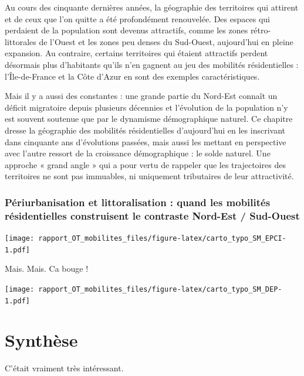 \documentclass[]{book}
\begin{document}
Au cours des cinquante dernières années, la géographie des territoires
qui attirent et de ceux que l'on quitte a été profondément renouvelée.
Des espaces qui perdaient de la population sont devenus attractifs,
comme les zones rétro-littorales de l'Ouest et les zones peu denses du
Sud-Ouest, aujourd'hui en pleine expansion. Au contraire, certains
territoires qui étaient attractifs perdent désormais plus d'habitants
qu'ils n'en gagnent au jeu des mobilités résidentielles :
l'Île-de-France et la Côte d'Azur en sont des exemples caractéristiques.

Mais il y a aussi des constantes : une grande partie du Nord-Est connaît
un déficit migratoire depuis plusieurs décennies et l'évolution de la
population n'y est souvent soutenue que par le dynamisme démographique
naturel. Ce chapitre dresse la géographie des mobilités résidentielles
d'aujourd'hui en les inscrivant dans cinquante ans d'évolutions passées,
mais aussi les mettant en perspective avec l'autre ressort de la
croissance démographique : le solde naturel. Une approche « grand angle
» qui a pour vertu de rappeler que les trajectoires des territoires ne
sont pas immuables, ni uniquement tributaires de leur attractivité.

\subsection{Périurbanisation et littoralisation : quand les mobilités
résidentielles construisent le contraste Nord-Est /
Sud-Ouest}\label{periurbanisation-et-littoralisation-quand-les-mobilites-residentielles-construisent-le-contraste-nord-est-sud-ouest}

\texttt{[image: rapport\_OT\_mobilites\_files/figure-latex/carto\_typo\_SM\_EPCI-1.pdf]}

Mais. Mais. Ca bouge !

\texttt{[image: rapport\_OT\_mobilites\_files/figure-latex/carto\_typo\_SM\_DEP-1.pdf]}

\chapter{Synthèse}\label{synthese}

C'était vraiment très intéressant.
\end{document}

